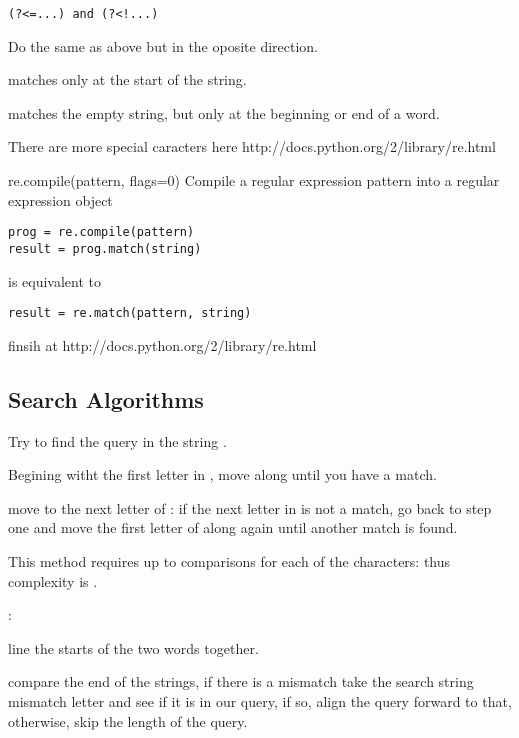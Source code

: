 \begin{lstlisting} 
(?<=...) and (?<!...)
\end{lstlisting}
Do the same as above but in the oposite direction.


\begin{compactitem}
\item {} matches only at the start of the string.
\item {} matches the empty string, but only at the beginning or end of a word.
\end{compactitem}

There are more special caracters here http://docs.python.org/2/library/re.html 

\begin{compactitem}
\item re.compile(pattern, flags=0)
Compile a regular expression pattern into a regular expression object
\begin{lstlisting}
prog = re.compile(pattern)
result = prog.match(string)
\end{lstlisting}
is equivalent to
\begin{lstlisting}
result = re.match(pattern, string)
\end{lstlisting}
finsih at http://docs.python.org/2/library/re.html
\end{compactitem}

\subsection{Search Algorithms}

\begin{A}
Try to find the query  in the string . 
\begin{compactitem}
\item Begining witht the first letter in , move along  until you have a match.
\item move to the next letter of : if the next letter in  is not a match, go back to step one and move the first letter of  along again until another match is found.
\end{compactitem}
This method requires up to  comparisons for each of the  characters: thus complexity is .
\end{A}

\begin{A}:
\begin{compactitem}
\item line the starts of the two words together. 
\item compare the end of the strings, if there is a mismatch take the search string mismatch letter and see if it is in our query, if so, align the query forward to that, otherwise, skip the length of the query.
\end{compactitem}
\end{A}

